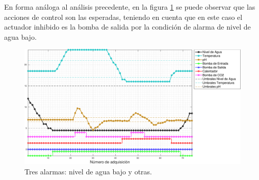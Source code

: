 En forma análoga al análisis precedente, en la figura \ref{fig:alarma3WaterLow} se puede observar que las acciones de control son las esperadas, teniendo en cuenta que en este caso el actuador inhibido es la bomba de salida por la condición de alarma de nivel de agua bajo.

\begin{figure}[hp]
\centering
    \includegraphics[width=\textwidth]{./Figures/plot3waterLow.pdf}
	\caption[Respuesta a tres alarmas simultáneas. Nivel de agua bajo y otras.]{Tres alarmas: nivel de agua bajo y otras.}
	\label{fig:alarma3WaterLow}
\end{figure}